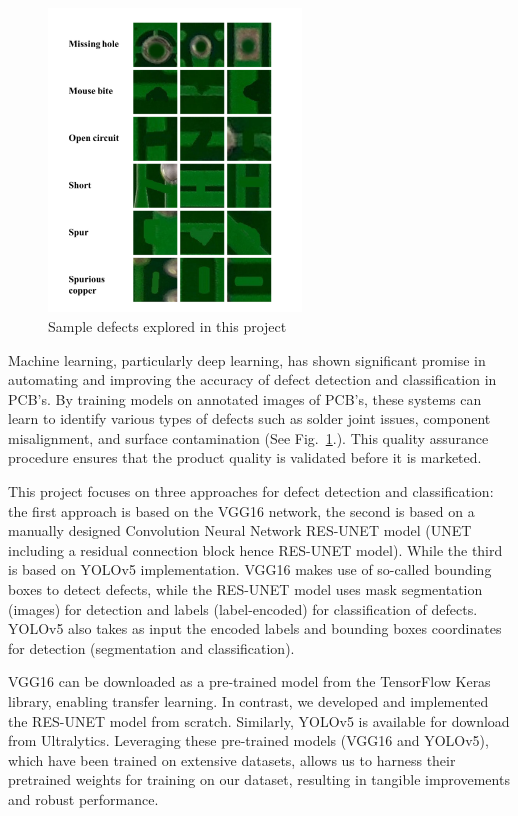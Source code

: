 \documentclass[12pt]{article}
\begin{document}
\begin{figure}[h]
    \centering
    \includegraphics[width=0.6\textwidth]{./graphics/Defects.png}
    \caption{Sample defects explored in this project}
    \label{fig:defects}
\end{figure}

Machine learning, particularly deep learning, has shown significant promise in automating and improving the accuracy of defect detection and classification in PCB's. By training models on annotated images of PCB's, these systems can learn to identify various types of defects such as solder joint issues, component misalignment, and surface contamination (See Fig.~\ref{fig:defects}.). This quality assurance procedure ensures that the product quality is validated before it is marketed.

This project focuses on three approaches for defect detection and classification: the first approach is based on the VGG16 network, the second is based on a manually designed Convolution Neural Network RES-UNET model (UNET including a residual connection block hence RES-UNET model). While the third is based on YOLOv5 implementation. 
VGG16 makes use of so-called bounding boxes to detect defects, while the RES-UNET model uses mask segmentation (images) for detection and labels (label-encoded) for classification of defects. YOLOv5 also takes as input the encoded labels and bounding boxes coordinates for detection (segmentation and classification).

VGG16 can be downloaded as a pre-trained model from the TensorFlow Keras library, enabling transfer learning. In contrast, we developed and implemented the RES-UNET model from scratch. Similarly, YOLOv5 is available for download from Ultralytics. Leveraging these pre-trained models (VGG16 and YOLOv5), which have been trained on extensive datasets, allows us to harness their pretrained weights for training on our dataset, resulting in tangible improvements and robust performance.
\end{document}
